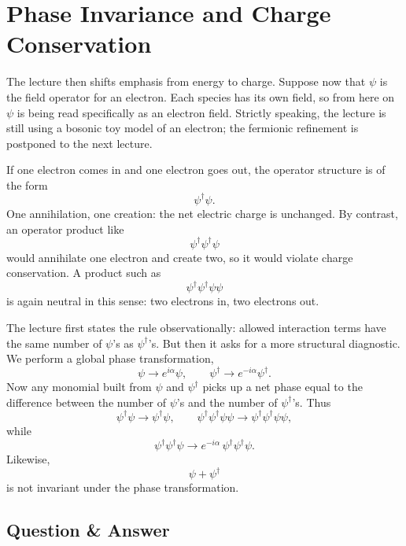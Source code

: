 \section{Phase Invariance and Charge Conservation}

The lecture then shifts emphasis from energy to charge. Suppose now that \(\psi\) is the field operator for an electron. Each species has its own field, so from here on \(\psi\) is being read specifically as an electron field. Strictly speaking, the lecture is still using a bosonic toy model of an electron; the fermionic refinement is postponed to the next lecture.

If one electron comes in and one electron goes out, the operator structure is of the form
\[
\psi^\dagger\psi.
\]
One annihilation, one creation: the net electric charge is unchanged. By contrast, an operator product like
\[
\psi^\dagger\psi^\dagger\psi
\]
would annihilate one electron and create two, so it would violate charge conservation. A product such as
\[
\psi^\dagger\psi^\dagger\psi\psi
\]
is again neutral in this sense: two electrons in, two electrons out.

The lecture first states the rule observationally: allowed interaction terms have the same number of \(\psi\)'s as \(\psi^\dagger\)'s. But then it asks for a more structural diagnostic. We perform a global phase transformation,
\begin{equation}
\psi \longrightarrow e^{i\alpha}\psi,
\qquad
\psi^\dagger \longrightarrow e^{-i\alpha}\psi^\dagger.
\end{equation}
Now any monomial built from \(\psi\) and \(\psi^\dagger\) picks up a net phase equal to the difference between the number of \(\psi\)'s and the number of \(\psi^\dagger\)'s. Thus
\begin{equation}
\psi^\dagger\psi \longrightarrow \psi^\dagger\psi,
\qquad
\psi^\dagger\psi^\dagger\psi\psi \longrightarrow \psi^\dagger\psi^\dagger\psi\psi,
\end{equation}
while
\begin{equation}
\psi^\dagger\psi^\dagger\psi \longrightarrow e^{-i\alpha}\,\psi^\dagger\psi^\dagger\psi.
\end{equation}
Likewise,
\begin{equation}
\psi+\psi^\dagger
\end{equation}
is not invariant under the phase transformation.

\subsection{Question \& Answer}

